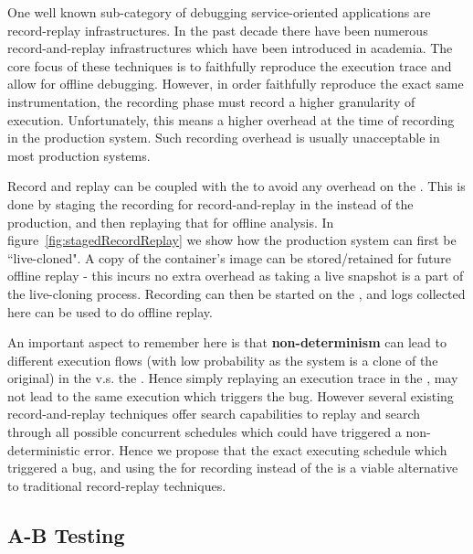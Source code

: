 One well known sub-category of debugging service-oriented applications are record-replay infrastructures.
In the past decade there have been numerous record-and-replay infrastructures which have been introduced in academia.
The core focus of these techniques is to faithfully reproduce the execution trace and allow for offline debugging.
However, in order faithfully reproduce the exact same instrumentation, the recording phase must record a higher granularity of execution.
Unfortunately, this means a higher overhead at the time of recording in the production system.
Such recording overhead is usually unacceptable in most production systems.

Record and replay can be coupled with the \debugcontainer to avoid any overhead on the \productioncontainer.
This is done by staging the recording for record-and-replay in the \debugcontainer instead of the production, and then replaying that for offline analysis.
In figure~\ref{fig:stagedRecordReplay} we show how the production system can first be ``live-cloned". A copy of the container's image can be stored/retained for future offline replay - this incurs no extra overhead as taking a live snapshot is a part of the live-cloning process. Recording can then be started on the \debugcontainer, and logs collected here can be used to do offline replay.

An important aspect to remember here is that \textbf{non-determinism} can lead to different execution flows (with low probability as the system is a clone of the original) in the \debugcontainer v.s. the \productioncontainer.
Hence simply replaying an execution trace in the \debugcontainer, may not lead to the same execution which triggers the bug.
However several existing record-and-replay techniques offer search capabilities to replay and search through all possible concurrent schedules which could have triggered a non-deterministic error.
Hence we propose that the exact executing schedule which triggered a bug, and using the \debugcontainer for recording instead of the \productioncontainer is a viable alternative to traditional record-replay techniques.

\subsection{A-B Testing}


